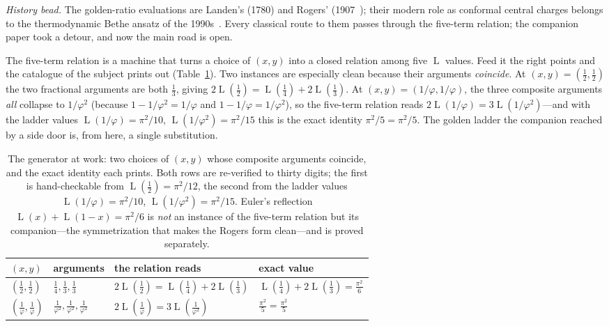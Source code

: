 \documentclass[11pt]{article}
\DeclareMathOperator{\Lrog}{L}
\begin{document}
\emph{History bead.} The golden-ratio evaluations are Landen's (1780) and Rogers'
(1907~\cite{rogers}); their modern role as conformal central charges belongs to the
thermodynamic Bethe ansatz of the 1990s~\cite{zamolodchikov,nahm,kirillov}. Every classical
route to them passes through the five-term relation; the companion paper took a detour, and
now the main road is open.

The five-term relation is a machine that turns a choice of $(x,y)$ into a closed relation
among five $\Lrog$ values. Feed it the right points and the catalogue of the subject prints
out (Table~\ref{tab:instances}). Two instances are especially clean because their arguments
\emph{coincide}. At $(x,y)=(\tfrac12,\tfrac12)$ the two fractional arguments are both
$\tfrac13$, giving $2\Lrog(\tfrac12)=\Lrog(\tfrac14)+2\Lrog(\tfrac13)$. At
$(x,y)=(1/\varphi,1/\varphi)$, the three composite arguments \emph{all} collapse to
$1/\varphi^2$ (because $1-1/\varphi^2=1/\varphi$ and $1-1/\varphi=1/\varphi^2$), so the
five-term relation reads $2\Lrog(1/\varphi)=3\Lrog(1/\varphi^2)$---and with the ladder
values $\Lrog(1/\varphi)=\pi^2/10$, $\Lrog(1/\varphi^2)=\pi^2/15$ this is the exact identity
$\pi^2/5=\pi^2/5$. The golden ladder the companion reached by a side door is, from here, a
single substitution.

\begin{table}[h]
\centering\small
{}
\begin{tabular}{@{}llll@{}}
\toprule
\rowcolor{ggteal!18} $(x,y)$ & arguments & the relation reads & exact value \\
\midrule
$(\tfrac12,\tfrac12)$ & $\tfrac14,\tfrac13,\tfrac13$
  & $2\Lrog(\tfrac12)=\Lrog(\tfrac14)+2\Lrog(\tfrac13)$
  & $\Lrog(\tfrac14)+2\Lrog(\tfrac13)=\tfrac{\pi^2}{6}$ \\
$(\tfrac1\varphi,\tfrac1\varphi)$ & $\tfrac1{\varphi^2},\tfrac1{\varphi^2},\tfrac1{\varphi^2}$
  & $2\Lrog(\tfrac1\varphi)=3\Lrog(\tfrac1{\varphi^2})$
  & $\tfrac{\pi^2}{5}=\tfrac{\pi^2}{5}$ \\
\bottomrule
\end{tabular}
\caption{The generator at work: two choices of $(x,y)$ whose composite arguments coincide,
and the exact identity each prints. Both rows are re-verified to thirty digits; the first is
hand-checkable from $\Lrog(\tfrac12)=\pi^2/12$, the second from the ladder values
$\Lrog(1/\varphi)=\pi^2/10$, $\Lrog(1/\varphi^2)=\pi^2/15$. Euler's reflection
$\Lrog(x)+\Lrog(1-x)=\pi^2/6$ is \emph{not} an instance of the five-term relation but its
companion---the symmetrization that makes the Rogers form clean---and is proved separately.}
\label{tab:instances}
\end{table}
\end{document}
